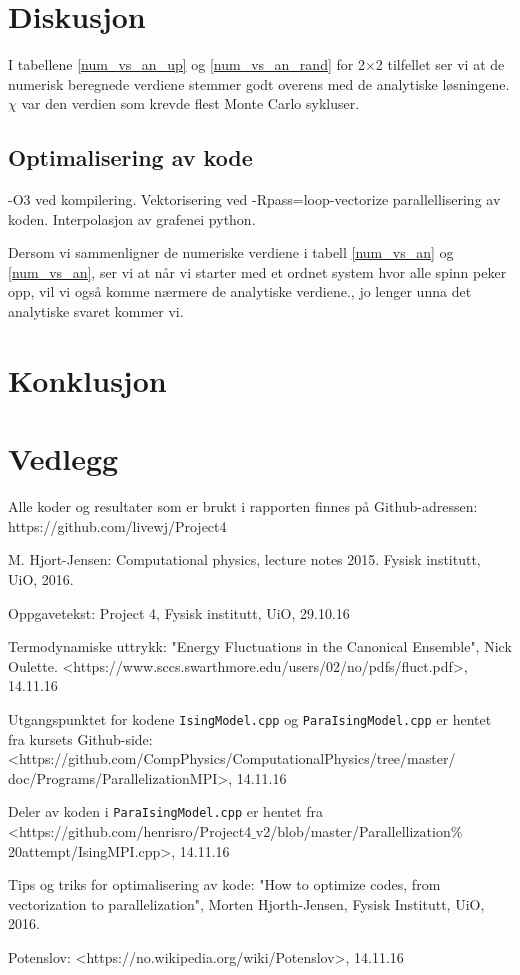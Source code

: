 \documentclass[11pt,a4paper]{article}
\begin{document}
\section{Diskusjon}
I tabellene \ref{num_vs_an_up} og \ref{num_vs_an_rand} for 2$\times$2 tilfellet ser vi at de numerisk beregnede verdiene stemmer godt overens med de analytiske løsningene. 
$\chi$ var den verdien som krevde flest Monte Carlo sykluser. 



\subsection{Optimalisering av kode}
-O3 ved kompilering. 
Vektorisering ved -Rpass=loop-vectorize
parallellisering av koden.
Interpolasjon av grafenei python.

Dersom vi sammenligner de numeriske verdiene i tabell \ref{num_vs_an} og \ref{num_vs_an}, ser vi at når vi starter med et ordnet system hvor alle spinn peker opp, vil vi også komme nærmere de analytiske verdiene., jo lenger unna det analytiske svaret kommer vi. 

\section{Konklusjon}

\section{Vedlegg}
Alle koder og resultater som er brukt i rapporten finnes på Github-adressen: \\
https://github.com/livewj/Project4



\begin{thebibliography}{9}  
    
\bibitem{}
   M. Hjort-Jensen: Computational physics, lecture notes 2015. Fysisk institutt, UiO, 2016.

\bibitem{}
   Oppgavetekst: Project 4, Fysisk institutt, UiO, 29.10.16
   
 \bibitem{}
   Termodynamiske uttrykk: "Energy Fluctuations in the Canonical Ensemble", Nick Oulette. <https://www.sccs.swarthmore.edu/users/02/no/pdfs/fluct.pdf>, 14.11.16
  
  \bibitem{}
  Utgangspunktet for kodene \texttt{IsingModel.cpp} og \texttt{ParaIsingModel.cpp} er hentet fra kursets Github-side:
  <https://github.com/CompPhysics/ComputationalPhysics/tree/master/\\
  doc/Programs/ParallelizationMPI>, 14.11.16
  
\bibitem{}
  Deler av koden i \texttt{ParaIsingModel.cpp} er hentet fra \\ <https://github.com/henrisro/Project4$\_$v2/blob/master/Parallellization$\%$20attempt/IsingMPI.cpp>,
  14.11.16

\bibitem{}
 Tips og triks for optimalisering av kode:
 "How to optimize codes, from vectorization to parallelization", Morten Hjorth-Jensen, Fysisk Institutt, UiO, 2016.
 
\bibitem{}
  Potenslov:
 <https://no.wikipedia.org/wiki/Potenslov>, 14.11.16

   
\end{thebibliography}
\end{document}
